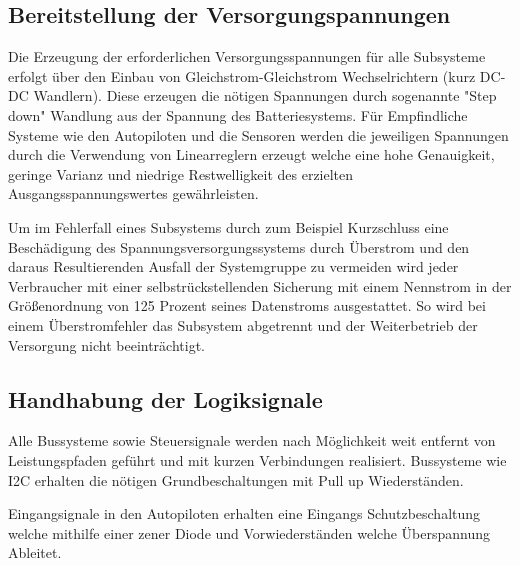 \subsection{Bereitstellung der Versorgungspannungen}

Die Erzeugung der erforderlichen Versorgungsspannungen für alle Subsysteme erfolgt über den Einbau von Gleichstrom-Gleichstrom Wechselrichtern (kurz DC-DC Wandlern).
Diese erzeugen die nötigen Spannungen durch sogenannte "Step down"  Wandlung aus der Spannung des Batteriesystems.
Für Empfindliche Systeme wie den Autopiloten und die Sensoren werden die jeweiligen Spannungen durch die Verwendung von Linearreglern erzeugt welche eine hohe Genauigkeit, geringe Varianz und niedrige Restwelligkeit des erzielten Ausgangsspannungswertes gewährleisten.

Um im Fehlerfall eines Subsystems durch zum Beispiel Kurzschluss eine Beschädigung des Spannungsversorgungssystems durch Überstrom und den daraus Resultierenden Ausfall der Systemgruppe zu vermeiden wird jeder Verbraucher mit einer selbstrückstellenden Sicherung mit einem Nennstrom in der Größenordnung von 125 Prozent seines Datenstroms ausgestattet.
So wird bei einem Überstromfehler das Subsystem abgetrennt und der Weiterbetrieb der Versorgung nicht beeinträchtigt.


\subsection{Handhabung der Logiksignale}

Alle Bussysteme sowie Steuersignale werden nach Möglichkeit weit entfernt von Leistungspfaden geführt und mit kurzen Verbindungen realisiert.
Bussysteme wie I2C erhalten die nötigen Grundbeschaltungen mit Pull up Wiederständen.

Eingangsignale in den Autopiloten erhalten eine Eingangs Schutzbeschaltung welche mithilfe einer zener Diode und Vorwiederständen welche Überspannung Ableitet.